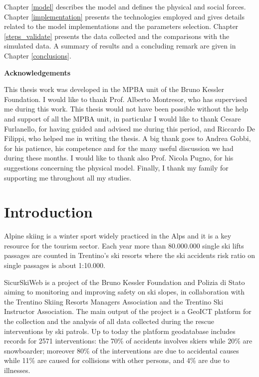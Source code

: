 \documentclass[12pt,a4paper,twoside]{book}
\makeatletter
\newcommand\ackname{Acknowledgements}
\newenvironment{acknowledgements}{%
      \titlepage
      \null\vfil
      \@beginparpenalty\@lowpenalty
      \begin{center}%
        \bfseries \ackname
        \@endparpenalty\@M
      \end{center}}%
     {\par\vfil\null\endtitlepage}
\newenvironment{acknowledgements}{%
      \if@twocolumn
        \section*{\abstractname}%
      \else
        \small
        \begin{center}%
          {\bfseries \ackname\vspace{-.5em}\vspace{\z@}}%
        \end{center}%
        \quotation
      \fi}
      {\if@twocolumn\else\endquotation\fi}
\makeatother
\begin{document}
Chapter \ref{model} describes the model and defines the physical and social forces. Chapter \ref{implementation} presents the technologies employed and gives details related to the model implementations and the parameters selection. Chapter \ref{steps_validate} presents the data collected and the comparisons with the simulated data. A summary of results and a concluding remark are given in Chapter \ref{conclusions}.

\begin{acknowledgements}
This thesis work was developed in the MPBA unit of the Bruno Kessler Foundation. I would like to thank Prof. Alberto Montresor, who has supervised me during this work. This thesis would not have been possible without the help and support of all the MPBA unit, in particular I would like to thank Cesare Furlanello, for having guided and advised me during this period, and Riccardo De Filippi, who helped me in writing the thesis. A big thank goes to Andrea Gobbi, for his patience, his competence and for the many useful discussion we had during these months. I would like to thank also Prof. Nicola Pugno, for his suggestions concerning the physical model. Finally, I thank my family for supporting me throughout all my studies.
\end{acknowledgements}

\tableofcontents

\chapter{Introduction}
Alpine skiing is a winter sport widely practiced in the Alps and it is a key resource for the tourism sector. Each year more than 80.000.000 single ski lifts passages are counted in Trentino's ski resorts where the ski accidents risk ratio on single passages is about 1:10.000.

SicurSkiWeb is a project of the Bruno Kessler Foundation and Polizia di Stato aiming to monitoring and improving safety on ski slopes, in collaboration with the Trentino Skiing Resorts Managers Association and the Trentino Ski Instructor Association. The main output of the project is a GeoICT platform for the collection and the analysis of all data collected during the rescue interventions by ski patrols. Up to today the platform geodatabase includes records for 2571 interventions: the 70\% of accidents involves skiers while 20\% are snowboarder; moreover 80\% of the interventions are due to accidental causes while 11\% are caused for collisions with other persons, and 4\% are due to illnesses.
\end{document}
